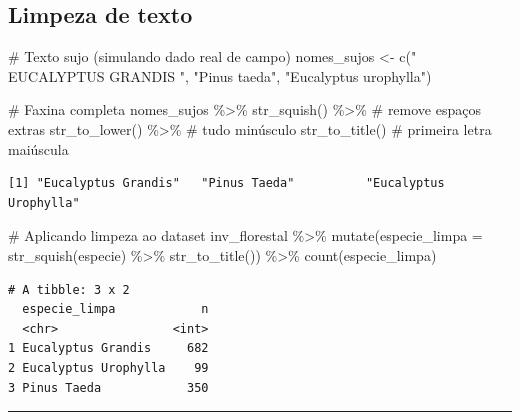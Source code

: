 \documentclass[
  letterpaper,
]{scrbook}
\newenvironment{Shaded}{\begin{snugshade}}{\end{snugshade}}
\newcommand{\AttributeTok}[1]{\textcolor[rgb]{0.40,0.45,0.13}{#1}}
\newcommand{\CommentTok}[1]{\textcolor[rgb]{0.37,0.37,0.37}{#1}}
\newcommand{\FunctionTok}[1]{\textcolor[rgb]{0.28,0.35,0.67}{#1}}
\newcommand{\NormalTok}[1]{\textcolor[rgb]{0.00,0.23,0.31}{#1}}
\newcommand{\OtherTok}[1]{\textcolor[rgb]{0.00,0.23,0.31}{#1}}
\newcommand{\SpecialCharTok}[1]{\textcolor[rgb]{0.37,0.37,0.37}{#1}}
\newcommand{\StringTok}[1]{\textcolor[rgb]{0.13,0.47,0.30}{#1}}
\begin{document}
\subsection{Limpeza de texto}\label{limpeza-de-texto}

\begin{Shaded}
\begin{Highlighting}[]
\CommentTok{\# Texto sujo (simulando dado real de campo)}
\NormalTok{nomes\_sujos }\OtherTok{\textless{}{-}} \FunctionTok{c}\NormalTok{(}\StringTok{"  EUCALYPTUS GRANDIS  "}\NormalTok{, }\StringTok{"Pinus taeda"}\NormalTok{, }\StringTok{"Eucalyptus  urophylla"}\NormalTok{)}

\CommentTok{\# Faxina completa}
\NormalTok{nomes\_sujos }\SpecialCharTok{\%\textgreater{}\%}
  \FunctionTok{str\_squish}\NormalTok{() }\SpecialCharTok{\%\textgreater{}\%}        \CommentTok{\# remove espaços extras}
  \FunctionTok{str\_to\_lower}\NormalTok{() }\SpecialCharTok{\%\textgreater{}\%}      \CommentTok{\# tudo minúsculo}
  \FunctionTok{str\_to\_title}\NormalTok{()          }\CommentTok{\# primeira letra maiúscula}
\end{Highlighting}
\end{Shaded}

\begin{verbatim}
[1] "Eucalyptus Grandis"   "Pinus Taeda"          "Eucalyptus Urophylla"
\end{verbatim}

\begin{Shaded}
\begin{Highlighting}[]
\CommentTok{\# Aplicando limpeza ao dataset}
\NormalTok{inv\_florestal }\SpecialCharTok{\%\textgreater{}\%}
  \FunctionTok{mutate}\NormalTok{(}\AttributeTok{especie\_limpa =} \FunctionTok{str\_squish}\NormalTok{(especie) }\SpecialCharTok{\%\textgreater{}\%} \FunctionTok{str\_to\_title}\NormalTok{()) }\SpecialCharTok{\%\textgreater{}\%}
  \FunctionTok{count}\NormalTok{(especie\_limpa)}
\end{Highlighting}
\end{Shaded}

\begin{verbatim}
# A tibble: 3 x 2
  especie_limpa            n
  <chr>                <int>
1 Eucalyptus Grandis     682
2 Eucalyptus Urophylla    99
3 Pinus Taeda            350
\end{verbatim}

\begin{center}\rule{0.5\linewidth}{0.5pt}\end{center}
\end{document}
